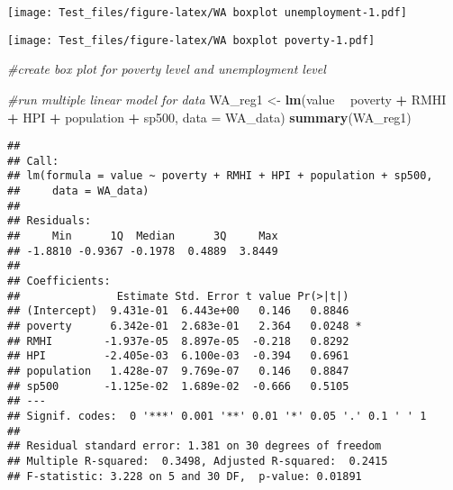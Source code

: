 \documentclass[
]{article}
\newenvironment{Shaded}{\begin{snugshade}}{\end{snugshade}}
\newcommand{\CommentTok}[1]{\textcolor[rgb]{0.56,0.35,0.01}{\textit{#1}}}
\newcommand{\DataTypeTok}[1]{\textcolor[rgb]{0.13,0.29,0.53}{#1}}
\newcommand{\KeywordTok}[1]{\textcolor[rgb]{0.13,0.29,0.53}{\textbf{#1}}}
\newcommand{\NormalTok}[1]{#1}
\newcommand{\OperatorTok}[1]{\textcolor[rgb]{0.81,0.36,0.00}{\textbf{#1}}}
\newcommand{\StringTok}[1]{\textcolor[rgb]{0.31,0.60,0.02}{#1}}
\begin{document}
\texttt{[image: Test\_files/figure-latex/WA boxplot unemployment-1.pdf]}

\begin{Shaded}
\end{Shaded}

\texttt{[image: Test\_files/figure-latex/WA boxplot poverty-1.pdf]}

\begin{Shaded}
\begin{Highlighting}[]
\CommentTok{#create box plot for poverty level and unemployment level}
\end{Highlighting}
\end{Shaded}

\begin{Shaded}
\begin{Highlighting}[]
\CommentTok{#run multiple linear model for data}
\NormalTok{WA_reg1 <-}\StringTok{ }\KeywordTok{lm}\NormalTok{(value }\OperatorTok{~}\StringTok{ }\NormalTok{poverty }\OperatorTok{+}\StringTok{ }\NormalTok{RMHI }\OperatorTok{+}\StringTok{ }\NormalTok{HPI }\OperatorTok{+}\StringTok{ }\NormalTok{population }\OperatorTok{+}\StringTok{ }\NormalTok{sp500, }\DataTypeTok{data =}\NormalTok{ WA_data)}
\KeywordTok{summary}\NormalTok{(WA_reg1)}
\end{Highlighting}
\end{Shaded}

\begin{verbatim}
## 
## Call:
## lm(formula = value ~ poverty + RMHI + HPI + population + sp500, 
##     data = WA_data)
## 
## Residuals:
##     Min      1Q  Median      3Q     Max 
## -1.8810 -0.9367 -0.1978  0.4889  3.8449 
## 
## Coefficients:
##               Estimate Std. Error t value Pr(>|t|)  
## (Intercept)  9.431e-01  6.443e+00   0.146   0.8846  
## poverty      6.342e-01  2.683e-01   2.364   0.0248 *
## RMHI        -1.937e-05  8.897e-05  -0.218   0.8292  
## HPI         -2.405e-03  6.100e-03  -0.394   0.6961  
## population   1.428e-07  9.769e-07   0.146   0.8847  
## sp500       -1.125e-02  1.689e-02  -0.666   0.5105  
## ---
## Signif. codes:  0 '***' 0.001 '**' 0.01 '*' 0.05 '.' 0.1 ' ' 1
## 
## Residual standard error: 1.381 on 30 degrees of freedom
## Multiple R-squared:  0.3498, Adjusted R-squared:  0.2415 
## F-statistic: 3.228 on 5 and 30 DF,  p-value: 0.01891
\end{verbatim}
\end{document}
